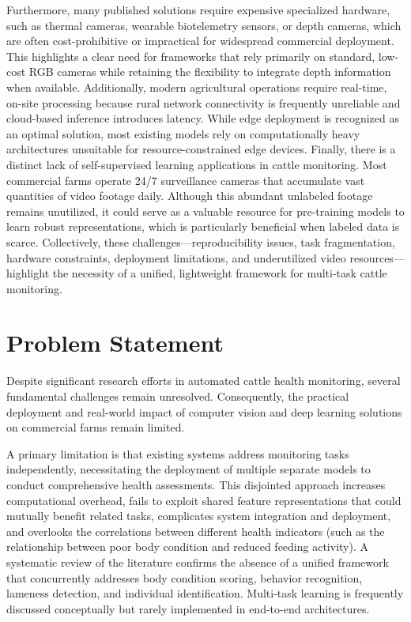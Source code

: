 Furthermore, many published solutions require expensive specialized hardware, such as thermal cameras, wearable biotelemetry sensors, or depth cameras, which are often cost-prohibitive or impractical for widespread commercial deployment. This highlights a clear need for frameworks that rely primarily on standard, low-cost RGB cameras while retaining the flexibility to integrate depth information when available. Additionally, modern agricultural operations require real-time, on-site processing because rural network connectivity is frequently unreliable and cloud-based inference introduces latency. While edge deployment is recognized as an optimal solution, most existing models rely on computationally heavy architectures unsuitable for resource-constrained edge devices. Finally, there is a distinct lack of self-supervised learning applications in cattle monitoring. Most commercial farms operate 24/7 surveillance cameras that accumulate vast quantities of video footage daily. Although this abundant unlabeled footage remains unutilized, it could serve as a valuable resource for pre-training models to learn robust representations, which is particularly beneficial when labeled data is scarce. Collectively, these challenges---reproducibility issues, task fragmentation, hardware constraints, deployment limitations, and underutilized video resources---highlight the necessity of a unified, lightweight framework for multi-task cattle monitoring.


\section{Problem Statement}

Despite significant research efforts in automated cattle health monitoring, several fundamental challenges remain unresolved. Consequently, the practical deployment and real-world impact of computer vision and deep learning solutions on commercial farms remain limited.

A primary limitation is that existing systems address monitoring tasks independently, necessitating the deployment of multiple separate models to conduct comprehensive health assessments. This disjointed approach increases computational overhead, fails to exploit shared feature representations that could mutually benefit related tasks, complicates system integration and deployment, and overlooks the correlations between different health indicators (such as the relationship between poor body condition and reduced feeding activity). A systematic review of the literature confirms the absence of a unified framework that concurrently addresses body condition scoring, behavior recognition, lameness detection, and individual identification. Multi-task learning is frequently discussed conceptually but rarely implemented in end-to-end architectures.

